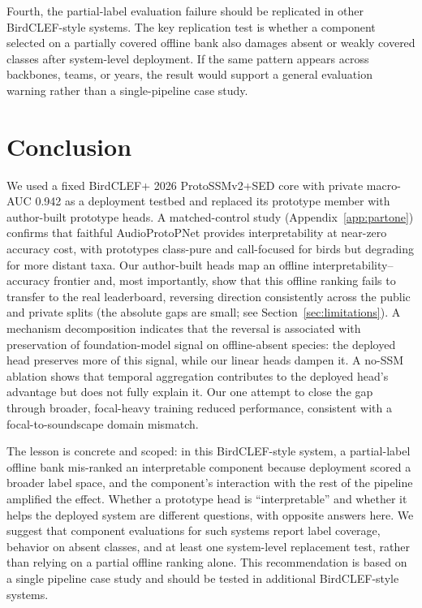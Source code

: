 \documentclass{ceurart}
\begin{document}
Fourth, the partial-label evaluation failure should be replicated in other BirdCLEF-style systems.
The key replication test is whether a component selected on a partially covered offline bank also damages absent or weakly covered classes after system-level deployment.
If the same pattern appears across backbones, teams, or years, the result would support a general evaluation warning rather than a single-pipeline case study.

\section{Conclusion}
\label{sec:conclusion}

We used a fixed BirdCLEF+ 2026 ProtoSSMv2+SED core with private macro-AUC 0.942 as a deployment testbed and replaced its prototype member with author-built prototype heads.
A matched-control study (Appendix~\ref{app:partone}) confirms that faithful AudioProtoPNet provides interpretability at near-zero accuracy cost, with prototypes class-pure and call-focused for birds but degrading for more distant taxa.
Our author-built heads map an offline interpretability--accuracy frontier and, most importantly, show that this offline ranking fails to transfer to the real leaderboard, reversing direction consistently across the public and private splits (the absolute gaps are small; see Section~\ref{sec:limitations}).
A mechanism decomposition indicates that the reversal is associated with preservation of foundation-model signal on offline-absent species: the deployed head preserves more of this signal, while our linear heads dampen it. A no-SSM ablation shows that temporal aggregation contributes to the deployed head's advantage but does not fully explain it. Our one attempt to close the gap through broader, focal-heavy training reduced performance, consistent with a focal-to-soundscape domain mismatch.

The lesson is concrete and scoped: in this BirdCLEF-style system, a partial-label offline bank mis-ranked an interpretable component because deployment scored a broader label space, and the component's interaction with the rest of the pipeline amplified the effect.
Whether a prototype head is ``interpretable'' and whether it helps the deployed system are different questions, with opposite answers here.
We suggest that component evaluations for such systems report label coverage, behavior on absent classes, and at least one system-level replacement test, rather than relying on a partial offline ranking alone. This recommendation is based on a single pipeline case study and should be tested in additional BirdCLEF-style systems.
\end{document}
